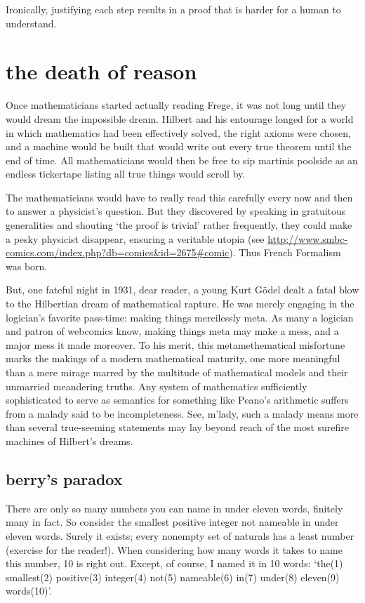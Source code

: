 \documentclass{scrbook}
\begin{document}
Ironically, justifying each step results in a proof that is harder for a human to understand. 
\section[The Death of Reason]{the death of reason}
Once mathematicians started actually reading Frege, it was not long until they would dream the impossible dream. Hilbert and his entourage longed for a world in which mathematics had been effectively solved, the right axioms were chosen, and a machine would be built that would write out every true theorem until the end of time. All mathematicians would then be free to sip martinis poolside as an endless tickertape listing all true things would scroll by. \cite{wiki:hilbert-prog}

The mathematicians would have to really read this carefully every now and then to answer a physicist's question. But they discovered by speaking in gratuitous generalities and shouting `the proof is trivial' rather frequently, they could make a pesky physicist disappear, ensuring a veritable utopia (see \url{http://www.smbc-comics.com/index.php?db=comics&id=2675#comic}). Thus French Formalism was born.  

But, one fateful night in 1931, dear reader, a young Kurt Gödel dealt a fatal blow to the Hilbertian dream of mathematical rapture. He was merely engaging in the logician's favorite pass-time: making things mercilessly meta. As many a logician and patron of webcomics know, making things meta may make a mess, and a major mess it made moreover. To his merit, this metamethematical misfortune marks the makings of a modern mathematical maturity, one more meaningful than a mere mirage marred by the multitude of mathematical models and their unmarried meandering truths. Any system of mathematics sufficiently sophisticated to serve as semantics for something like Peano's arithmetic suffers from a malady said to be incompleteness. See, m'lady, such a malady means more than several true-seeming statements may lay beyond reach of the most surefire machines of Hilbert's dreams.

\subsection{berry's paradox}
There are only so many numbers you can name in under eleven words, finitely many in fact. So consider the smallest positive integer not nameable in under eleven words. Surely it exists; every nonempty set of naturals has a least number (exercise for the reader!). When considering how many words it takes to name this number, 10 is right out. Except, of course, I named it in 10 words: `the(1) smallest(2) positive(3) integer(4) not(5) nameable(6) in(7) under(8) eleven(9) words(10)'.  
\end{document}
